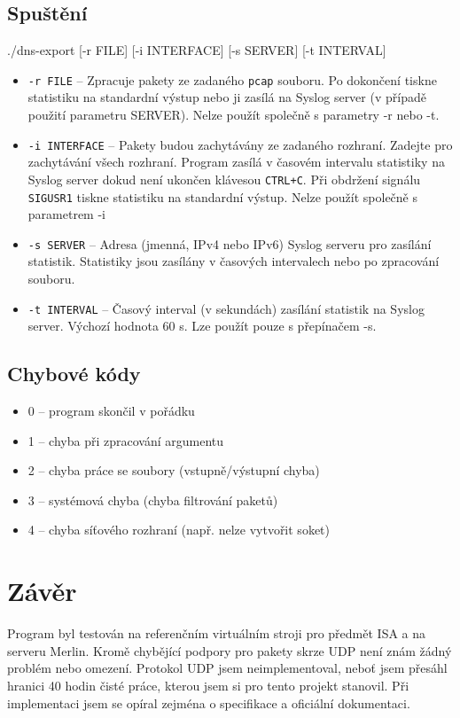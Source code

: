 \documentclass[11pt,a4paper]{article}
\begin{document}
\subsection{Spuštění}
./dns-export [-r FILE] [-i INTERFACE] [-s SERVER] [-t INTERVAL]
\begin{itemize}
\item \texttt{-r FILE} -- Zpracuje pakety ze zadaného \texttt{pcap} souboru. Po dokončení tiskne statistiku na standardní výstup nebo ji zasílá na Syslog server (v případě použití parametru SERVER). Nelze použít společně s parametry -r nebo -t.
\item \texttt{-i INTERFACE} -- Pakety budou zachytávány ze zadaného rozhraní. Zadejte  pro zachytávání všech rozhraní. Program zasílá v časovém intervalu statistiky na Syslog server dokud není ukončen klávesou \texttt{CTRL+C}. Při obdržení signálu \texttt{SIGUSR1} tiskne statistiku na standardní výstup. Nelze použít společně s parametrem -i
\item \texttt{-s SERVER} -- Adresa (jmenná, IPv4 nebo IPv6) Syslog serveru pro zasílání statistik. Statistiky jsou zasílány v časových intervalech nebo po zpracování souboru.
\item \texttt{-t INTERVAL} -- Časový interval (v sekundách) zasílání statistik na Syslog server. Výchozí hodnota 60 s. Lze použít pouze s přepínačem -s.
\end{itemize}

\subsection{Chybové kódy}
\begin{itemize}
\item 0 -- program skončil v pořádku
\item 1 -- chyba při zpracování argumentu
\item 2 -- chyba práce se soubory (vstupně/výstupní chyba)
\item 3 -- systémová chyba (chyba filtrování paketů)
\item 4 -- chyba síťového rozhraní (např. nelze vytvořit soket)
\end{itemize}

\section{Závěr}
Program byl testován na referenčním virtuálním stroji pro předmět ISA a na serveru Merlin. Kromě chybějící podpory pro pakety skrze UDP není znám žádný problém nebo omezení. Protokol UDP jsem neimplementoval, neboť jsem přesáhl hranici 40 hodin čisté práce, kterou jsem si pro tento projekt stanovil. Při implementaci jsem se opíral zejména o specifikace a oficiální dokumentaci.



\end{document}

